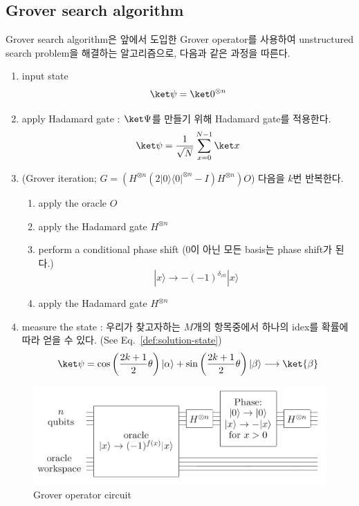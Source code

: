 \vspace{1em}

\subsection{Grover search algorithm}
Grover search algorithm은 앞에서 도입한 Grover operator를 사용하여 unstructured search problem을 해결하는 알고리즘으로, 다음과 같은 과정을 따른다.
\begin{enumerate}
  \item input state 
  \begin{equation*}
    \ket \psi = \ket 0^{\otimes n}
  \end{equation*}
  \item apply Hadamard gate : $\ket \Psi$를 만들기 위해 Hadamard gate를 적용한다.
  \begin{equation*}
    \ket \psi = \frac{1}{\sqrt N} \sum_{x=0}^{N-1}\ket x
  \end{equation*}
  \item (Grover iteration; $G = (H^{\otimes n}(2|0\rangle\langle 0|^{\otimes n}-I) H^{\otimes n})O$) 다음을 $k$번 반복한다.
  \begin{enumerate}
    \item apply the oracle $O$
    \item apply the Hadamard gate $H^{\otimes n}$
    \item perform a conditional phase shift ($0$이 아닌 모든 basis는 phase shift가 된다.)
    \begin{equation*}
      |x\rangle \rightarrow-(-1)^{\delta_{x 0}}|x\rangle 
    \end{equation*}
    \item apply the Hadamard gate $H^{\otimes n}$
  \end{enumerate}
  \item measure the state : 우리가 찾고자하는 $M$개의 항목중에서 하나의 idex를 확률에 따라 얻을 수 있다. (See Eq.~\eqref{def:solution-state})
  \begin{equation*}
    \ket \psi = \cos \left(\frac{2 k+1}{2} \theta\right)|\alpha\rangle+\sin \left(\frac{2 k+1}{2} \theta\right)|\beta\rangle \longrightarrow \ket{\beta}
  \end{equation*}
\end{enumerate}


\begin{figure}[h]
  \centering
  \includegraphics[width=0.6\linewidth]{figures/Grover_operator.png}
  \caption{Grover operator circuit}
  \label{fig:grover-operator-circuit}
\end{figure}

